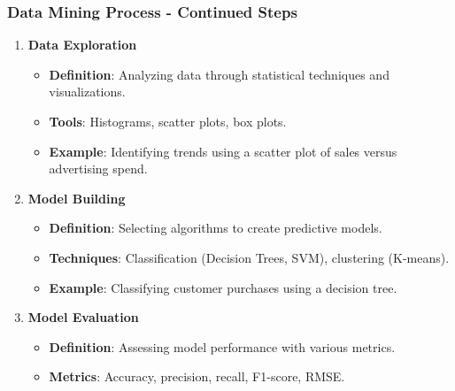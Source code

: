 \documentclass[aspectratio=169]{beamer}
\begin{document}
\begin{frame}[fragile]
    \frametitle{Data Mining Process - Continued Steps}
    \begin{enumerate}[resume]
        \item \textbf{Data Exploration}
        \begin{itemize}
            \item \textbf{Definition}: Analyzing data through statistical techniques and visualizations.
            \item \textbf{Tools}: Histograms, scatter plots, box plots.
            \item \textbf{Example}: Identifying trends using a scatter plot of sales versus advertising spend.
        \end{itemize}

        \item \textbf{Model Building}
        \begin{itemize}
            \item \textbf{Definition}: Selecting algorithms to create predictive models.
            \item \textbf{Techniques}: Classification (Decision Trees, SVM), clustering (K-means).
            \item \textbf{Example}: Classifying customer purchases using a decision tree.
        \end{itemize}

        \item \textbf{Model Evaluation}
        \begin{itemize}
            \item \textbf{Definition}: Assessing model performance with various metrics.
            \item \textbf{Metrics}: Accuracy, precision, recall, F1-score, RMSE.
        \end{itemize}
    \end{enumerate}
\end{frame}
\end{document}
